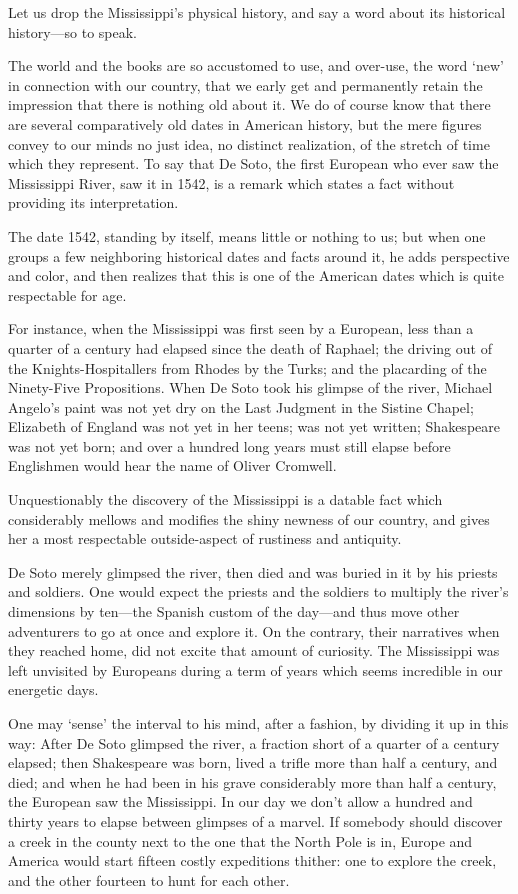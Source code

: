 \documentclass[../../../demo.tex]{novelettesubdoc}
\begin{document}
Let us drop the Mississippi's physical history, and say a word about its
historical history---so to speak.

The world and the books are so accustomed to use, and over-use, the word
`new' in connection with our country, that we early get and permanently
retain the impression that there is nothing old about it. We do of
course know that there are several comparatively old dates in American
history, but the mere figures convey to our minds no just idea, no
distinct realization, of the stretch of time which they represent.
To say that De Soto, the first European who ever saw the Mississippi
River, saw it in 1542, is a remark which states a fact without
providing its interpretation.

The date 1542, standing by itself, means little or nothing to us; but
when one groups a few neighboring historical dates and facts around it,
he adds perspective and color, and then realizes that this is one of the
American dates which is quite respectable for age.

For instance, when the Mississippi was first seen by a European, less
than a quarter of a century had elapsed since the death of Raphael;
the driving out of the Knights-Hospitallers from Rhodes by
the Turks; and the placarding of the Ninety-Five Propositions.
When De Soto took his glimpse of the river,
Michael Angelo's paint was not yet dry on the Last
Judgment in the Sistine Chapel; Elizabeth of England was
not yet in her teens;  was not yet written;
Shakespeare was not yet born; and over a hundred long years must
still elapse before Englishmen would hear the name of Oliver Cromwell.

Unquestionably the discovery of the Mississippi is a datable fact which
considerably mellows and modifies the shiny newness of our country, and
gives her a most respectable outside-aspect of rustiness and antiquity.

De Soto merely glimpsed the river, then died and was buried in it by his
priests and soldiers. One would expect the priests and the soldiers
to multiply the river's dimensions by ten---the Spanish custom of the
day---and thus move other adventurers to go at once and
explore it. On the contrary, their narratives when they reached home,
did not excite that amount of curiosity. The Mississippi was left
unvisited by Europeans during a term of years which seems incredible in our
energetic days.

One may `sense' the interval to his mind, after a fashion, by dividing it
up in this way: After De Soto glimpsed the river, a fraction short of
a quarter of a century elapsed; then Shakespeare was born,
lived a trifle more than half a century, and died; and when he had been in
his grave considerably more than half a century, the  European
saw the Mississippi. In our day we don't allow a hundred and thirty years to
elapse between glimpses of a marvel. If somebody should discover a creek
in the county next to the one that the North Pole is in, Europe and
America would start fifteen costly expeditions thither: one to explore
the creek, and the other fourteen to hunt for each other.
\end{document}
